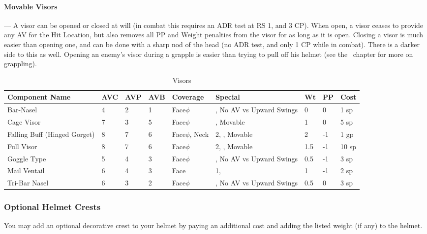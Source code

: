 \documentclass[oneside,11pt,english]{book}
\begin{document}
\paragraph{\label{par:Movable Visors}Movable Visors}---\quad
A visor can be opened or closed at will (in combat this requires an ADR test at RS 1, and 3 CP). When open, a visor ceases to provide any AV for the Hit Location, but also removes all PP and Weight penalties from the visor for as long as it is open. Closing a visor is much easier than opening one, and can be done with a sharp nod of the head (no ADR test, and only 1 CP while in combat). There is a darker side to this as well. Opening an enemy’s visor during a grapple is easier than trying to pull off his helmet (see the ~chapter for more on grappling).

\begin{longtabu} to 
	\caption{Visors}
	\label{tab:Visors}\\
Component Name&AVC&AVP&AVB& Coverage& Special& Wt&PP&Cost\\\toprule
Bar-Nasel& 4& 2& 1& Face\hyperref[sec:Weak Spots]{$\phi$}& , No AV vs Upward Swings &0& 0& 1 sp\\
Cage Visor& 7& 3& 5& Face\hyperref[sec:Weak Spots]{$\phi$}& , Movable& 1& 0& 5 sp\\
Falling Buff 
(Hinged Gorget)& 8& 7& 6& Face\hyperref[sec:Weak Spots]{$\phi$}, Neck&  2, , 
Movable& 2 &-1& 1 gp\\
Full Visor& 8& 7& 6& Face\hyperref[sec:Weak Spots]{$\phi$}&  2, , 
Movable& 1.5 &-1& 10 sp\\
Goggle Type& 5& 4& 3& Face\hyperref[sec:Weak Spots]{$\phi$}& , No AV vs Upward Swings &0.5 &-1& 3 sp\\
Mail Ventail& 6& 4& 3& Face&  1, & 1 &-1& 2 sp\\
Tri-Bar Nasel& 6& 3& 2& Face\hyperref[sec:Weak Spots]{$\phi$}& , No AV vs Upward Swings &0.5& 0& 3 sp\\
\end{longtabu}

\subsubsection{Optional Helmet Crests}
You may add an optional decorative crest to your helmet by paying an additional cost and adding the listed weight (if any) to the helmet.
\end{document}
